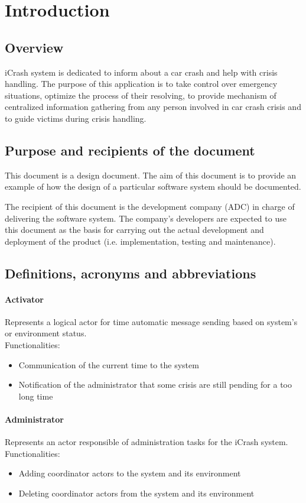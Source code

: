 \chapter{Introduction}
\label{chap:introduction}


\section{Overview}
iCrash system is dedicated to inform about a car crash and help with crisis handling. The purpose of this
application is to take control over emergency situations, optimize the process of their resolving, to provide
mechanism of centralized information gathering from any person involved in car crash crisis and to guide
victims during crisis handling.

\section{Purpose and recipients of the document}
This document is a design document. The aim of this document is to provide an
example of how the design of a particular software system should be documented. 

The recipient of this document is the development company (ADC) in charge
of delivering the software system. The company's developers are
expected to use this document as the basis for carrying out the actual
development and deployment of the product (i.e. implementation, testing
and maintenance).


\section{Definitions, acronyms and abbreviations}

\subsubsection{Activator}
Represents a logical actor for time automatic message sending based on system’s
or environment status.\\
Functionalities:
\begin{itemize}
  \item Communication of the current time to the system
  \item Notification of the administrator that some crisis are still pending for
  a too long time
\end{itemize}

\subsubsection{Administrator}
Represents an actor responsible of administration tasks for the iCrash system.\\
Functionalities:
\begin{itemize}
  \item Adding coordinator actors to the system and its environment
  \item Deleting coordinator actors from the system and its environment
\end{itemize}

